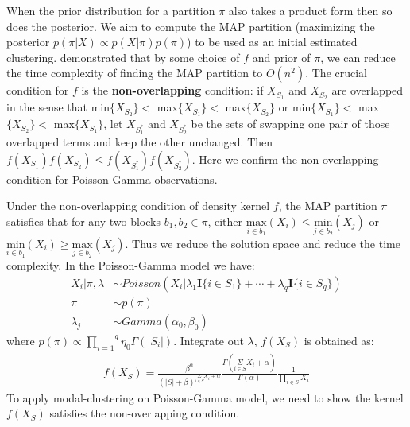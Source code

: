 \documentclass[aoas,preprint]{imsart}
\begin{document}
When the prior distribution for a partition $\pi$  also takes a product form then so does the
posterior.  We aim to compute
the MAP partition (maximizing the posterior $p(\pi | X) \propto p(X|\pi) p(\pi)$) to be used
as an initial  estimated clustering.
\cite{ref:dahl} demonstrated that by some choice of $f$ and prior of $\pi$, we can reduce the time complexity of finding the MAP partition to $O(n^2)$.
The crucial condition for $f$ is the \textbf{non-overlapping} condition:
if $X_{S_1}$ and $X_{S_2}$ are overlapped in the sense that  min$\{X_{S_2}\}  <$ max$\{X_{S_1}\}  <$ max$\{X_{S_2}\}$ or min$\{X_{S_1}\}  <$ max$\{X_{S_2}\}  <$ max$\{X_{S_1}\}$, 
let $X_{S_1^*} \text{ and } X_{S_2^*}$ be the sets of swapping one pair of those overlapped terms and keep the other unchanged. Then $f(X_{S_1}) f(X_{S_2}) \leq f(X_{S_1^*}) f(X_{S_2^*})$. Here we 
confirm the non-overlapping condition for Poisson-Gamma observations.

Under the non-overlapping condition of density kernel $f$, 
the MAP partition $\pi$ satisfies 
that for any two blocks $b_1, b_2 \in \pi$, either $\underset{i \in b_1}{\text{max}}(X_i) \leq \underset{j\in b_2}{\text{min}}(X_j)$ or $\underset{i \in b_1}{\text{min}}(X_i) \geq \underset{j\in b_2}{\text{max}}(X_j)$. Thus we reduce the solution space and reduce the time complexity.
In the Poisson-Gamma model we have:
\begin{align*}
X_i | \pi, \lambda &\sim Poisson(X_i | \lambda_1\textbf{I}\{i\in S_1\} + \cdots + \lambda_q\textbf{I}\{i \in S_q\})\\
\pi &\sim p(\pi)\\
\lambda_j &\sim Gamma(\alpha_0, \beta_0)
\end{align*}
where $p(\pi)\propto \overset{q}{\underset{i = 1}{\prod}}\eta_0\Gamma(|S_i|)$. Integrate out $\lambda$, $f(X_{S})$ is obtained as:
\begin{eqnarray*}
f(X_{S}) = \frac{\beta^\alpha}{(|S| + \beta)^{\underset{i \in S}{\Sigma} X_i + \alpha}} \frac{\Gamma\left(\underset{i \in S}{\Sigma} X_i  + \alpha\right)}{\Gamma(\alpha)} \frac{1}{\underset{i \in S}{\prod }X_i}
\end{eqnarray*}
To apply modal-clustering on Poisson-Gamma model, we need to show the kernel $f(X_S)$ satisfies the 
non-overlapping condition.
\end{document}

